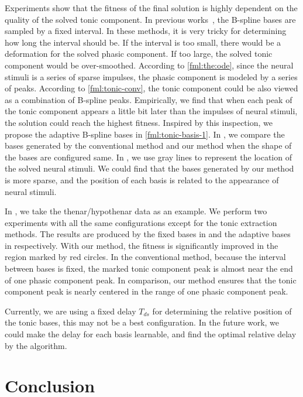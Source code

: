 \documentclass[10pt,conference]{ieeeconf}
\begin{document}
Experiments show that the fitness of the final solution is highly dependent on the quality of the solved tonic component. In previous works~\cite{greco2015cvxeda,amin2019tonic}, the B-spline bases are sampled by a fixed interval. In these methods, it is very tricky for determining how long the interval should be. If the interval is too small, there would be a deformation for the solved phasic component. If too large, the solved tonic component would be over-smoothed. According to \eqref{fml:the:ode}, since the neural stimuli is a series of sparse impulses, the phasic component is modeled by a series of peaks. According to \eqref{fml:tonic-conv}, the tonic component could be also viewed as a combination of B-spline peaks. Empirically, we find that when each peak of the tonic component appears a little bit later than the impulses of neural stimuli, the solution could reach the highest fitness. Inspired by this inspection, we propose the adaptive B-spline bases in \eqref{fml:tonic-basis-1}. In , we compare the bases generated by the conventional method and our method when the shape of the bases are configured same. In , we use gray lines to represent the location of the solved neural stimuli. We could find that the bases generated by our method is more sparse, and the position of each basis is related to the appearance of neural stimuli.

In , we take the thenar/hypothenar data as an example. We perform two experiments with all the same configurations except for the tonic extraction methods. The results are produced by the fixed bases in  and the adaptive bases in  respectively. With our method, the fitness is significantly improved in the region marked by red circles. In the conventional method, because the interval between bases is fixed, the marked tonic component peak is almost near the end of one phasic component peak. In comparison, our method ensures that the tonic component peak is nearly centered in the range of one phasic component peak.

Currently, we are using a fixed delay $T_{ds}$ for determining the relative position of the tonic bases, this may not be a best configuration. In the future work, we could make the delay for each basis learnable, and find the optimal relative delay by the algorithm. 

\section{Conclusion}
\end{document}
